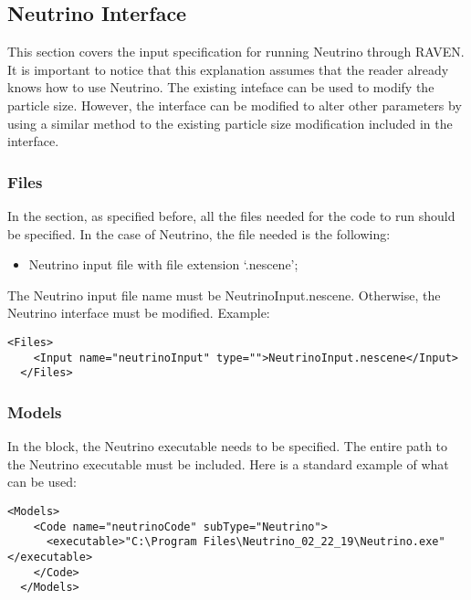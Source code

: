 \subsection{Neutrino Interface}
\label{subsec:neutrinoInterface}
This section covers the input specification for running Neutrino through RAVEN. It is important to notice
that this explanation assumes that the reader already knows how to use Neutrino. The existing inteface can be used to modify the particle size.
However, the interface can be modified to alter other parameters by using a similar method to the
existing particle size modification included in the interface.

\subsubsection{Files}
In the  section, as specified before, all the files needed for the code to
run should be specified. In the case of Neutrino, the file needed is the following:
\begin{itemize}
  \item Neutrino input file with file extension `.nescene';
\end{itemize}
The Neutrino input file name must be NeutrinoInput.nescene. Otherwise, the Neutrino interface must be modified.
%
Example:
\begin{lstlisting}[style=XML]
  <Files>
    <Input name="neutrinoInput" type="">NeutrinoInput.nescene</Input>
  </Files>
\end{lstlisting}

\subsubsection{Models}
In the  block, the Neutrino executable needs to be specified. The entire path to the Neutrino executable must be included.
 Here is a standard example of what
can be used:
\begin{lstlisting}[style=XML]
  <Models>
    <Code name="neutrinoCode" subType="Neutrino">
      <executable>"C:\Program Files\Neutrino_02_22_19\Neutrino.exe"</executable>
    </Code>
  </Models>
\end{lstlisting}

